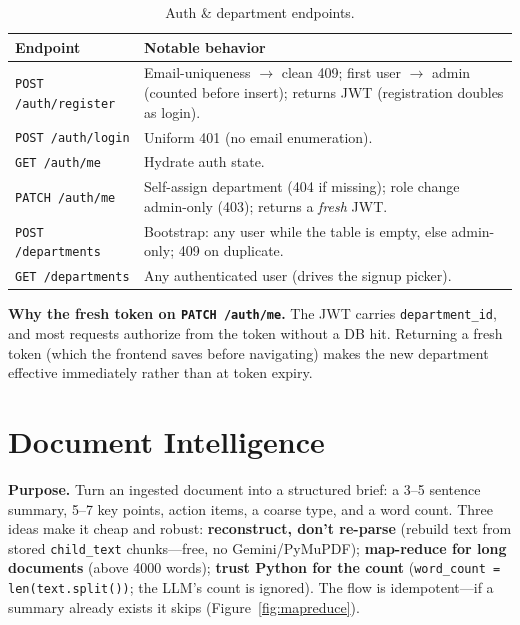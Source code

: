 \documentclass[11pt,a4paper,oneside]{report}
\newcommand{\code}[1]{\texttt{#1}}
\begin{document}
\begin{table}[htbp]
\centering
\caption{Auth \& department endpoints.}
\label{tab:authendpoints}
\begin{tabularx}{\linewidth}{|l|X|}
\hline
\rowcolor{ink}
{\color{white}\textbf{Endpoint}} & {\color{white}\textbf{Notable behavior}}\\
\hline
\code{POST /auth/register} & Email-uniqueness $\to$ clean 409; first user $\to$ admin (counted before insert); returns JWT (registration doubles as login).\\ \hline
\code{POST /auth/login} & Uniform 401 (no email enumeration).\\ \hline
\code{GET /auth/me} & Hydrate auth state.\\ \hline
\code{PATCH /auth/me} & Self-assign department (404 if missing); role change admin-only (403); returns a \emph{fresh} JWT.\\ \hline
\code{POST /departments} & Bootstrap: any user while the table is empty, else admin-only; 409 on duplicate.\\ \hline
\code{GET /departments} & Any authenticated user (drives the signup picker).\\ \hline
\end{tabularx}
\end{table}

\textbf{Why the fresh token on \code{PATCH /auth/me}.} The JWT carries \code{department\_id}, and most
requests authorize from the token without a DB hit. Returning a fresh token (which the frontend saves
before navigating) makes the new department effective immediately rather than at token expiry.

\section{Document Intelligence}
\label{sec:intel}
\textbf{Purpose.} Turn an ingested document into a structured brief: a 3--5 sentence summary, 5--7 key
points, action items, a coarse type, and a word count. Three ideas make it cheap and robust:
\textbf{reconstruct, don't re-parse} (rebuild text from stored \code{child\_text} chunks---free, no
Gemini/PyMuPDF); \textbf{map-reduce for long documents} (above 4000 words); \textbf{trust Python for
the count} (\code{word\_count = len(text.split())}; the LLM's count is ignored). The flow is
idempotent---if a summary already exists it skips (Figure~\ref{fig:mapreduce}).
\end{document}
